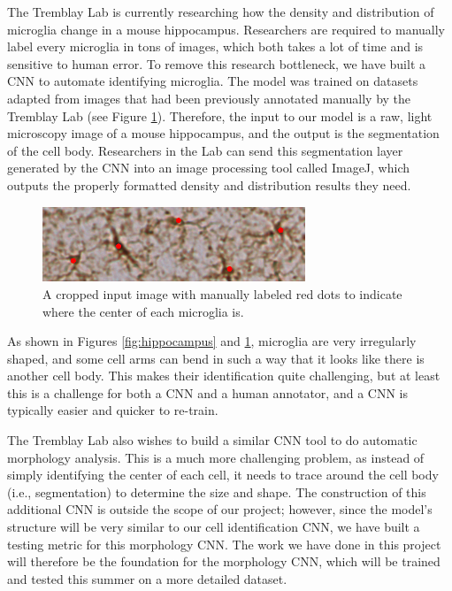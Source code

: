 \documentclass{article}
\begin{document}
The Tremblay Lab is currently researching how the density and distribution of 
microglia change in a mouse hippocampus. Researchers are required to manually 
label every microglia in tons of images, which both takes a lot of time and 
is sensitive to human error. To remove this research bottleneck, we have 
built a CNN to automate identifying microglia. The model was trained on 
datasets adapted from images that had been previously annotated manually by 
the Tremblay Lab (see Figure \ref{fig:classification-dot}). Therefore, the 
input to our model is a raw, light microscopy image of a mouse hippocampus, 
and the output is the segmentation of the cell body. Researchers in the Lab 
can send this segmentation layer generated by the CNN into an image 
processing tool called ImageJ, which outputs the properly formatted density 
and distribution results they need.

\begin{figure}[ht]
  \includegraphics[width=0.7\textwidth]{classification-dot.png}
  \centering
  \captionsetup{width=0.7\textwidth}
  \caption{A cropped input image with manually labeled red dots to indicate where 
  the center of each microglia is.}
  \label{fig:classification-dot}
\end{figure}

As shown in Figures \ref{fig:hippocampus} and \ref{fig:classification-dot}, 
microglia are very irregularly shaped, and some cell arms can bend in such a 
way that it looks like there is another cell body. This makes their 
identification quite challenging, but at least this is a challenge for both a 
CNN and a human annotator, and a CNN is typically easier and quicker to 
re-train.

The Tremblay Lab also wishes to build a similar CNN tool to do automatic 
morphology analysis. This is a much more challenging problem, as instead of 
simply identifying the center of each cell, it needs to trace around the cell 
body (i.e., segmentation) to determine the size and shape. The construction 
of this additional CNN is outside the scope of our project; however, since 
the model's structure will be very similar to our cell identification CNN, we 
have built a testing metric for this morphology CNN. The work we have done in 
this project will therefore be the foundation for the morphology CNN, which 
will be trained and tested this summer on a more detailed dataset. 
\end{document}
